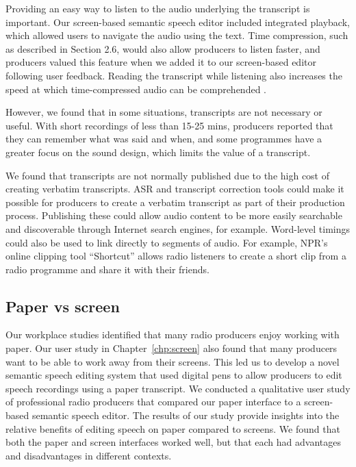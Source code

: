 
Providing an easy way to listen to the audio underlying the transcript is important. Our screen-based semantic speech
editor included integrated playback, which allowed users to navigate the audio using the text.  Time compression, such
as described in Section 2.6, would also allow producers to listen faster, and producers valued this feature when we
added it to our screen-based editor following user feedback. Reading the transcript while listening also increases the
speed at which time-compressed audio can be comprehended \citep{Vemuri2004}.

However, we found that in some situations, transcripts are not necessary or useful. With short recordings of less than
15-25 mins, producers reported that they can remember what was said and when, and some programmes have a greater focus
on the sound design, which limits the value of a transcript.



We found that transcripts are not normally published due to the high cost of creating verbatim transcripts.  ASR and
transcript correction tools could make it possible for producers to create a verbatim transcript as part of their
production process.  Publishing these could allow audio content to be more easily searchable and discoverable through
Internet search engines, for example.  Word-level timings could also be used to link directly to segments of audio. For
example, NPR's online clipping tool ``Shortcut'' \citep{Friedhoff2016} allows radio listeners to create a short clip
from a radio programme and share it with their friends. 

\subsection{Paper vs screen}

Our workplace studies identified that many radio producers enjoy working with paper.  Our user study in
Chapter~\ref{chp:screen} also found that many producers want to be able to work away from their screens.  This led us
to develop a novel semantic speech editing system that used digital pens to allow producers to edit speech recordings
using a paper transcript.  We conducted a qualitative user study of professional radio producers that compared our
paper interface to a screen-based semantic speech editor. The results of our study provide insights into the relative
benefits of editing speech on paper compared to screens. We found that both the paper and screen interfaces worked
well, but that each had advantages and disadvantages in different contexts.

